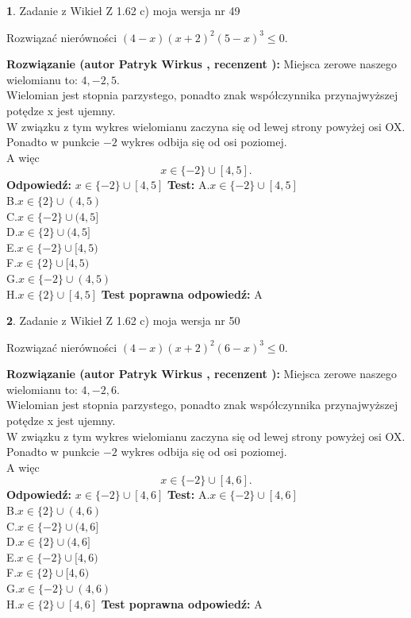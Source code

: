 \documentclass[12pt, a4paper]{article}
\theoremstyle{definition} %
\newtheorem{zad}{}
\newcommand{\zadStart}[1]{\begin{zad}#1\newline}
\newcommand{\zadStop}{\end{zad}}
\newcommand{\rozwStart}[2]{\noindent \textbf{Rozwiązanie (autor #1 , recenzent #2): }\newline}
\newcommand{\rozwStop}{\newline}
\newcommand{\odpStart}{\noindent \textbf{Odpowiedź:}\newline}
\newcommand{\odpStop}{\newline}
\newcommand{\testStart}{\noindent \textbf{Test:}\newline}
\newcommand{\testStop}{\newline}
\newcommand{\kluczStart}{\noindent \textbf{Test poprawna odpowiedź:}\newline}
\newcommand{\kluczStop}{\newline}
\begin{document}
\zadStart{Zadanie z Wikieł Z 1.62 c) moja wersja nr 49}

Rozwiązać nierówności $(4-x)(x+2)^{2}(5-x)^{3}\le0$.
\zadStop
\rozwStart{Patryk Wirkus}{}
Miejsca zerowe naszego wielomianu to: $4, -2, 5$.\\
Wielomian jest stopnia parzystego, ponadto znak współczynnika przy\linebreak najwyższej potędze x jest ujemny.\\ W związku z tym wykres wielomianu zaczyna się od lewej strony powyżej osi OX.\\
Ponadto w punkcie $-2$ wykres odbija się od osi poziomej.\\
A więc $$x \in \{-2\} \cup [4,5].$$
\rozwStop
\odpStart
$x \in \{-2\} \cup [4,5]$
\odpStop
\testStart
A.$x \in \{-2\} \cup [4,5]$\\
B.$x \in \{2\} \cup (4,5)$\\
C.$x \in \{-2\} \cup (4,5]$\\
D.$x \in \{2\} \cup (4,5]$\\
E.$x \in \{-2\} \cup [4,5)$\\
F.$x \in \{2\} \cup [4,5)$\\
G.$x \in \{-2\} \cup (4,5)$\\
H.$x \in \{2\} \cup [4,5]$
\testStop
\kluczStart
A
\kluczStop



\zadStart{Zadanie z Wikieł Z 1.62 c) moja wersja nr 50}

Rozwiązać nierówności $(4-x)(x+2)^{2}(6-x)^{3}\le0$.
\zadStop
\rozwStart{Patryk Wirkus}{}
Miejsca zerowe naszego wielomianu to: $4, -2, 6$.\\
Wielomian jest stopnia parzystego, ponadto znak współczynnika przy\linebreak najwyższej potędze x jest ujemny.\\ W związku z tym wykres wielomianu zaczyna się od lewej strony powyżej osi OX.\\
Ponadto w punkcie $-2$ wykres odbija się od osi poziomej.\\
A więc $$x \in \{-2\} \cup [4,6].$$
\rozwStop
\odpStart
$x \in \{-2\} \cup [4,6]$
\odpStop
\testStart
A.$x \in \{-2\} \cup [4,6]$\\
B.$x \in \{2\} \cup (4,6)$\\
C.$x \in \{-2\} \cup (4,6]$\\
D.$x \in \{2\} \cup (4,6]$\\
E.$x \in \{-2\} \cup [4,6)$\\
F.$x \in \{2\} \cup [4,6)$\\
G.$x \in \{-2\} \cup (4,6)$\\
H.$x \in \{2\} \cup [4,6]$
\testStop
\kluczStart
A
\kluczStop
\end{document}
